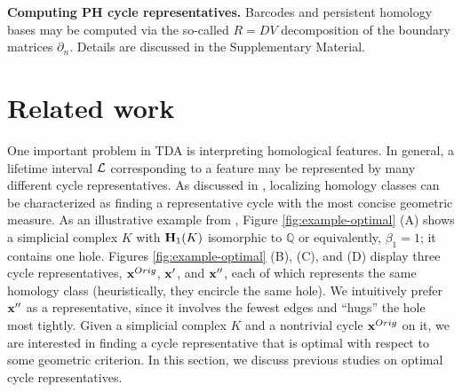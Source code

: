 \noindent \textbf{Computing PH cycle representatives.} Barcodes and persistent homology bases may be computed via the so-called $R = DV$ decomposition \cite{cohen2006vines} of the boundary matrices $\partial_n$. Details are discussed in the Supplementary Material.


\section{Related work \DIFaddbegin {}\DIFaddend }\label{problem formulation}


One important problem in TDA is interpreting homological features. In general, a lifetime interval $\mathcal{L}$ corresponding to a feature may be represented by many different cycle representatives. As discussed in \cite{chenquantifying}, localizing homology classes can be characterized as finding a representative cycle with the most concise geometric measure. As an illustrative example from \cite{Escolar2016}, Figure \ref{fig:example-optimal} (A) shows a simplicial complex $K$ with $\mathbf{H}_1(K)$ isomorphic to $\mathbb{Q}$ or equivalently, $\beta_1=1$; it contains one hole.  Figures \ref{fig:example-optimal} (B), (C), and (D) display three cycle representatives, $\mathbf{x}^{Orig}$, $\mathbf{x}'$, and $\mathbf{x}''$, each of which represents the same homology class (heuristically, they encircle the same hole). We intuitively prefer $\mathbf{x}''$ as a representative, since it involves the fewest edges  and ``hugs'' the hole most tightly. Given a simplicial complex $K$ and a nontrivial cycle $\mathbf{x}^{Orig}$ on it, we are interested in finding a cycle representative that is optimal with respect to some geometric criterion. In this section, we discuss previous studies on optimal cycle representatives. 

